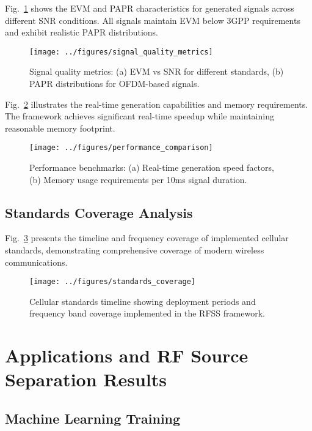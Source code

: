 \documentclass[conference]{IEEEtran}
\begin{document}
Fig.~\ref{fig:signal_quality} shows the EVM and PAPR characteristics for generated signals across different SNR conditions. All signals maintain EVM below 3GPP requirements and exhibit realistic PAPR distributions.

\begin{figure}[!t]
\centering
\texttt{[image: ../figures/signal\_quality\_metrics]}
\caption{Signal quality metrics: (a) EVM vs SNR for different standards, (b) PAPR distributions for OFDM-based signals.}
\label{fig:signal_quality}
\end{figure}

Fig.~\ref{fig:performance_comparison} illustrates the real-time generation capabilities and memory requirements. The framework achieves significant real-time speedup while maintaining reasonable memory footprint.

\begin{figure}[!t]
\centering
\texttt{[image: ../figures/performance\_comparison]}
\caption{Performance benchmarks: (a) Real-time generation speed factors, (b) Memory usage requirements per 10ms signal duration.}
\label{fig:performance_comparison}
\end{figure}

\subsection{Standards Coverage Analysis}

Fig.~\ref{fig:standards_coverage} presents the timeline and frequency coverage of implemented cellular standards, demonstrating comprehensive coverage of modern wireless communications.

\begin{figure}[!t]
\centering
\texttt{[image: ../figures/standards\_coverage]}
\caption{Cellular standards timeline showing deployment periods and frequency band coverage implemented in the RFSS framework.}
\label{fig:standards_coverage}
\end{figure}

\section{Applications and RF Source Separation Results}
\label{sec:applications}

\subsection{Machine Learning Training}
\end{document}

